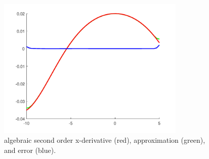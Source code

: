 \documentclass[paper=a4, fontsize=12pt]{article} %
\begin{document}
\begin{figure}[H]
  \centering
  \includegraphics[width=0.8\textwidth]{comparison-xx.pdf}
  \caption{\small algebraic second order x-derivative (red), approximation (green), and error (blue).\label{fig:2derivX}}
\end{figure}
\end{document}
